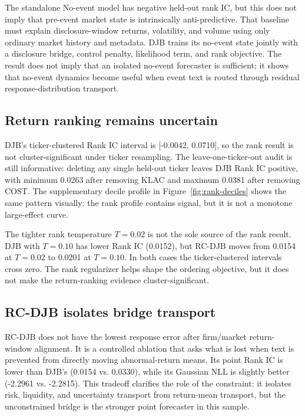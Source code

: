 \documentclass[10pt,letterpaper]{article}
\begin{document}
The standalone No-event model has negative held-out rank IC, but this does not imply that
pre-event market state is intrinsically anti-predictive. That baseline must explain
disclosure-window returns, volatility, and volume using only ordinary market history and metadata.
DJB trains its no-event state jointly with a disclosure bridge, control penalty, likelihood term,
and rank objective. The result does not imply that an isolated no-event forecaster is sufficient;
it shows that no-event dynamics become useful when event text is routed through residual
response-distribution transport.

\subsection{Return ranking remains uncertain}
DJB's ticker-clustered Rank IC interval is [-0.0042, 0.0710], so the rank result is not
cluster-significant under ticker resampling. The leave-one-ticker-out audit is still informative:
deleting any
single held-out ticker leaves DJB Rank IC positive, with minimum 0.0263 after removing KLAC and
maximum 0.0381 after removing COST. The supplementary decile profile in
Figure~\ref{fig:rank-deciles} shows the same pattern visually: the rank profile contains signal,
but it is not a monotone large-effect curve.

The tighter rank temperature \(T=0.02\) is not the sole source of the rank result. DJB with
\(T=0.10\) has lower Rank IC (0.0152), but RC-DJB moves from 0.0154 at \(T=0.02\) to 0.0201 at
\(T=0.10\). In both cases the ticker-clustered intervals cross zero. The rank regularizer helps
shape the ordering objective, but it does not make the return-ranking evidence cluster-significant.

\subsection{RC-DJB isolates bridge transport}
RC-DJB does not have the lowest response error after firm/market return-window alignment. It is a
controlled ablation that asks what is lost when text is prevented from directly moving
abnormal-return means. Its point Rank IC is lower than DJB's (0.0154 vs. 0.0330), while its
Gaussian NLL is slightly better (-2.2961 vs. -2.2815). This tradeoff clarifies the role of the
constraint: it isolates risk, liquidity, and uncertainty transport from return-mean transport, but
the unconstrained bridge is the stronger point forecaster in this sample.
\end{document}
